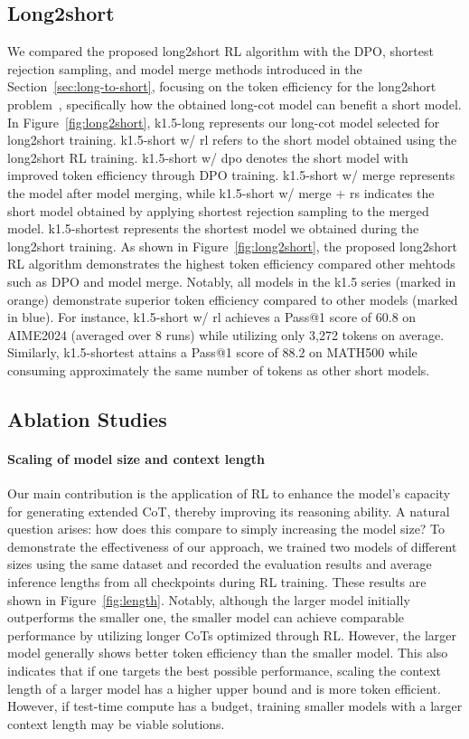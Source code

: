 \documentclass{article}
\newcommand{\citep}[1]{\parencite{#1}}
\begin{document}
\subsection{Long2short}
We compared the proposed long2short RL algorithm with the DPO, shortest rejection sampling, and model merge methods introduced in the Section~\ref{sec:long-to-short}, focusing on the token efficiency for the long2short problem~\citep{chen2024not}, specifically how the obtained long-cot model can benefit a short model. In Figure~\ref{fig:long2short}, k1.5-long represents our long-cot model selected for long2short training. k1.5-short w/ rl refers to the short model obtained using the long2short RL training. k1.5-short w/ dpo denotes the short model with improved token efficiency through DPO training. k1.5-short w/ merge represents the model after model merging, while k1.5-short w/ merge + rs indicates the short model obtained by applying shortest rejection sampling to the merged model. k1.5-shortest represents the shortest model we obtained during the long2short training. As shown in Figure~\ref{fig:long2short}, the proposed long2short RL algorithm demonstrates the highest token efficiency compared other mehtods such as DPO and model merge. Notably, all models in the k1.5 series (marked in orange) demonstrate superior token efficiency compared to other models (marked in blue). For instance, k1.5-short w/ rl achieves a Pass@1 score of 60.8 on AIME2024 (averaged over 8 runs) while utilizing only 3,272 tokens on average. Similarly, k1.5-shortest attains a Pass@1 score of 88.2 on MATH500 while consuming approximately the same number of tokens as other short models.

\subsection{Ablation Studies}

\paragraph{Scaling of model size and context length} 

Our main contribution is the application of RL to enhance the model's capacity for generating extended CoT, thereby improving its reasoning ability. 
A natural question arises: how does this compare to simply increasing the model size? To demonstrate the effectiveness of our approach, we trained two models of different sizes using the same dataset and recorded the evaluation results and average inference lengths from all checkpoints during RL training. These results are shown in Figure~\ref{fig:length}. Notably, although the larger model initially outperforms the smaller one, the smaller model can achieve comparable performance by utilizing longer CoTs optimized through RL. However, the larger model generally shows better token efficiency than the smaller model. 
This also indicates that if one targets the best possible performance, scaling the context length of a larger model has a higher upper bound and is more token efficient. However, if test-time compute has a budget, training smaller models with a larger context length may be viable solutions.
\end{document}

